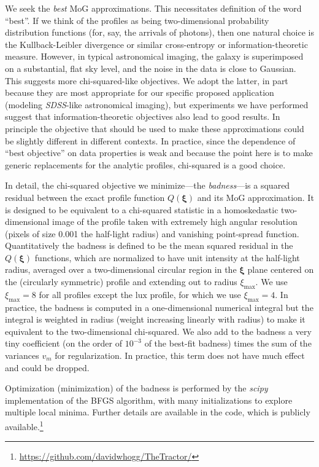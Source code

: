 \documentclass[12pt,pdftex,preprint]{aastex}
\newcommand{\project}[1]{\textsl{#1}}
\newcommand{\sdss}{\project{SDSS}}
\newcommand{\tvector}[1]{\boldsymbol{#1}}
\newcommand{\spos}{\tvector{\xi}}
\newcommand{\lux}{\mathrm{lux}}
\begin{document}
We seek the \emph{best} MoG approximations.  This necessitates
definition of the word ``best''.  If we think of the profiles as being
two-dimensional probability distribution functions (for, say, the
arrivals of photons), then one natural choice is the Kullback-Leibler
divergence or similar cross-entropy or information-theoretic measure.
However, in typical astronomical imaging, the galaxy is superimposed
on a substantial, flat sky level, and the noise in the data is close
to Gaussian.  This suggests more chi-squared-like objectives.  We
adopt the latter, in part because they are most appropriate for our
specific proposed application (modeling \sdss-like astronomical
imaging), but experiments we have performed suggest that
information-theoretic objectives also lead to good results.  In
principle the objective that should be used to make these
approximations could be slightly different in different contexts.  In
practice, since the dependence of ``best objective'' on data
properties is weak and because the point here is to make generic
replacements for the analytic profiles, chi-squared is a good choice.

In detail, the chi-squared objective we minimize---the
\emph{badness}---is a squared residual between the exact profile
function $Q(\spos)$ and its MoG approximation.  It is designed to be
equivalent to a chi-squared statistic in a homoskedastic
two-dimensional image of the profile taken with extremely high angular
resolution (pixels of size 0.001 the half-light radius) and vanishing
point-spread function.  Quantitatively the badness is defined to be
the mean squared residual in the $Q(\spos)$ functions, which are
normalized to have unit intensity at the half-light radius, averaged
over a two-dimensional circular region in the $\spos$ plane centered
on the (circularly symmetric) profile and extending out to radius
$\xi_{\max}$.  We use $\xi_{\max}=8$ for all profiles except the
$\lux$ profile, for which we use $\xi_{\max}=4$.  In practice, the
badness is computed in a one-dimensional numerical integral but the
integral is weighted in radius (weight increasing linearly with
radius) to make it equivalent to the two-dimensional chi-squared.  We
also add to the badness a very tiny coefficient (on the order of
$10^{-3}$ of the best-fit badness) times the sum of the variances
$v_m$ for regularization.  In practice, this term does not have much
effect and could be dropped.

Optimization (minimization) of the badness is performed by the
\project{scipy} implementation of the BFGS algorithm, with many
initializations to explore multiple local minima.  Further details are
available in the code, which is publicly
available.\footnote{\url{https://github.com/davidwhogg/TheTractor/}}
\end{document}
